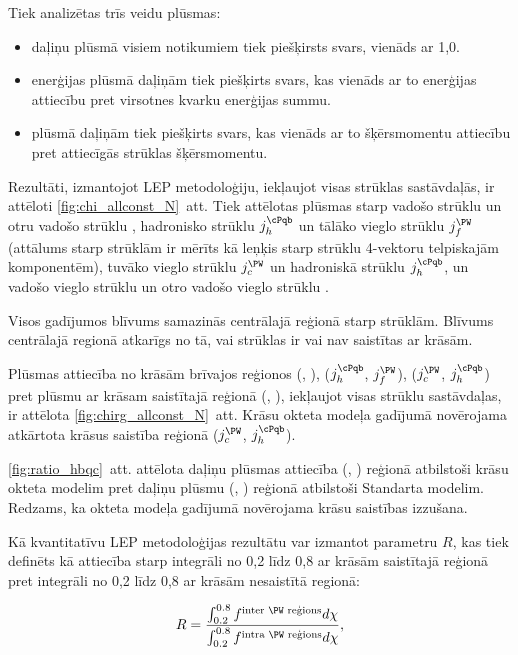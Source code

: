 \label{sec:LEP_methodology}

Tiek analizētas trīs veidu plūsmas:
\begin{itemize}
\item daļiņu plūsmā visiem notikumiem tiek piešķirsts svars, vienāds ar 1,0.
\item enerģijas plūsmā daļiņām tiek piešķirts svars, kas vienāds ar to enerģijas attiecību pret virsotnes kvarku enerģijas summu.
\item \pt plūsmā daļiņām tiek piešķirts svars, kas vienāds ar to šķērsmomentu attiecību pret attiecīgās strūklas šķērsmomentu.
\end{itemize}

Rezultāti, izmantojot LEP metodoloģiju, iekļaujot visas strūklas sastāvdaļās, ir attēloti \ref{fig:chi_allconst_N}~att. Tiek attēlotas plūsmas starp vadošo \cPqb strūklu \leadingb un otru vadošo \cPqb strūklu \scndleadingb, hadronisko \cPqb strūklu $j_{h}^{\cPqb}$ un tālāko vieglo strūklu $j_{f}^{\PW}$ (attālums starp strūklām ir mērīts kā leņķis starp strūklu 4-vektoru telpiskajām komponentēm), tuvāko vieglo strūklu $j_{c}^{\PW}$ un hadroniskā \cPqb strūklu $j_{h}^{\cPqb}$, un vadošo vieglo strūklu \leadingjet un otro vadošo vieglo strūklu \scndleadingjet.

Visos gadījumos blīvums samazinās centrālajā reģionā starp strūklām. Blīvums centrālajā regionā atkarīgs no tā, vai strūklas ir vai nav saistītas ar krāsām.

Plūsmas attiecība no krāsām brīvajos reģionos (\leadingb, \scndleadingb), ($j_{h}^{\cPqb}$, $j_{f}^{\PW}$), ($j_{c}^{\PW}$, $j_{h}^{\cPqb}$) pret plūsmu ar krāsam saistītajā reģionā (\leadingjet, \scndleadingjet), iekļaujot visas strūklu sastāvdaļas, ir attēlota \ref{fig:chirg_allconst_N}~att. Krāsu okteta \PW modeļa gadījumā novērojama atkārtota krāsus saistība reģionā ($j_{c}^{\PW}$, $j_{h}^{\cPqb}$).

\ref{fig:ratio_hbqc}~att. attēlota daļiņu plūsmas attiecība (\leadingjet, \scndleadingjet) reģionā atbilstoši krāsu okteta \PW modelim pret daļiņu plūsmu (\leadingjet, \scndleadingjet) reģionā atbilstoši Standarta modelim. Redzams, ka \PW okteta modeļa gadījumā novērojama krāsu saistības izzušana.

Kā kvantitatīvu LEP metodoloģijas rezultātu var izmantot parametru $R$, kas tiek definēts kā attiecība starp integrāli no 0,2 līdz 0,8 ar krāsām saistītajā reģionā pret integrāli no 0,2 līdz 0,8 ar krāsām nesaistītā regionā:

\begin{equation}
R=\frac{\int_{0.2}^{0.8}f^{\text{inter \PW reģions}}d\chi}{\int_{0.2}^{0.8}f^{\text{intra \PW reģions}}d\chi},
\end{equation}

